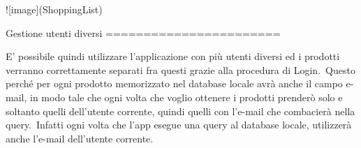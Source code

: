 ![image](ShoppingList)

Gestione utenti diversi
=======================

E’ possibile quindi utilizzare l’applicazione con più utenti diversi ed
i prodotti verranno correttamente separati fra questi grazie alla
procedura di Login.\
Questo perché per ogni prodotto memorizzato nel database locale avrà
anche il campo e-mail, in modo tale che ogni volta che voglio ottenere i
prodotti prenderò solo e soltanto quelli dell’utente corrente, quindi
quelli con l’e-mail che combacierà nella query.\
Infatti ogni volta che l’app esegue una query al database locale,
utilizzerà anche l’e-mail dell’utente corrente.
